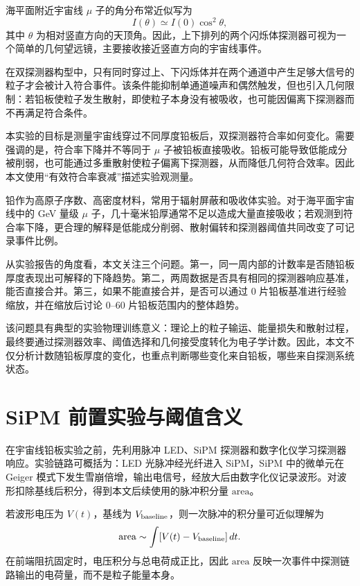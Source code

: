 \documentclass[aps,prl,twocolumn,superscriptaddress,nofootinbib]{revtex4-2}
\begin{document}
海平面附近宇宙线 $\mu$ 子的角分布常近似写为
\begin{equation}
I(\theta)\simeq I(0)\cos^2\theta ,
\end{equation}
其中 $\theta$ 为相对竖直方向的天顶角。因此，上下排列的两个闪烁体探测器可视为一个简单的几何望远镜，主要接收接近竖直方向的宇宙线事件。

在双探测器构型中，只有同时穿过上、下闪烁体并在两个通道中产生足够大信号的粒子才会被计入符合事件。该条件能抑制单通道噪声和偶然触发，但也引入几何限制：若铅板使粒子发生散射，即使粒子本身没有被吸收，也可能因偏离下探测器而不再满足符合条件。

本实验的目标是测量宇宙线穿过不同厚度铅板后，双探测器符合率如何变化。需要强调的是，符合率下降并不等同于 $\mu$ 子被铅板直接吸收。铅板可能导致低能成分被削弱，也可能通过多重散射使粒子偏离下探测器，从而降低几何符合效率。因此本文使用“有效符合率衰减”描述实验观测量。

铅作为高原子序数、高密度材料，常用于辐射屏蔽和吸收体实验。对于海平面宇宙线中的 GeV 量级 $\mu$ 子，几十毫米铅厚通常不足以造成大量直接吸收；若观测到符合率下降，更合理的解释是低能成分削弱、散射偏转和探测器阈值共同改变了可记录事件比例。

从实验报告的角度看，本文关注三个问题。第一，同一周内部的计数率是否随铅板厚度表现出可解释的下降趋势。第二，两周数据是否具有相同的探测器响应基准，能否直接合并。第三，如果不能直接合并，是否可以通过 0 片铅板基准进行经验缩放，并在缩放后讨论 0--60 片铅板范围内的整体趋势。

该问题具有典型的实验物理训练意义：理论上的粒子输运、能量损失和散射过程，最终要通过探测器效率、阈值选择和几何接受度转化为电子学计数。因此，本文不仅分析计数随铅板厚度的变化，也重点判断哪些变化来自铅板，哪些来自探测系统状态。

\section{SiPM 前置实验与阈值含义}

在宇宙线铅板实验之前，先利用脉冲 LED、SiPM 探测器和数字化仪学习探测器响应。实验链路可概括为：LED 光脉冲经光纤进入 SiPM，SiPM 中的微单元在 Geiger 模式下发生雪崩倍增，输出电信号，经放大后由数字化仪记录波形。对波形扣除基线后积分，得到本文后续使用的脉冲积分量 \(\mathrm{area}\)。

若波形电压为 \(V(t)\)，基线为 \(V_{\rm baseline}\)，则一次脉冲的积分量可近似理解为
\begin{equation}
\mathrm{area}\sim \int [V(t)-V_{\rm baseline}]\,dt .
\end{equation}
在前端阻抗固定时，电压积分与总电荷成正比，因此 \(\mathrm{area}\) 反映一次事件中探测链路输出的电荷量，而不是粒子能量本身。
\end{document}
